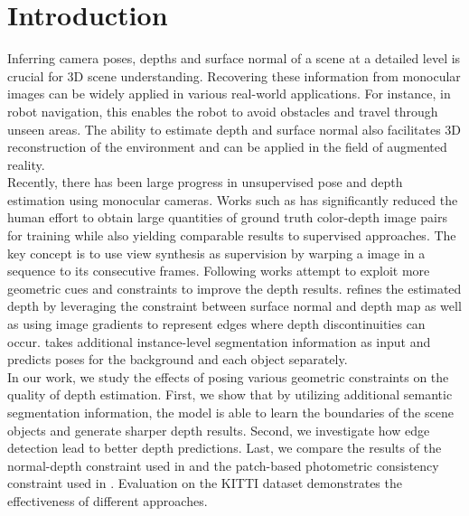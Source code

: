 \documentclass[10pt,twocolumn,letterpaper]{article}
\begin{document}
\section{Introduction}
Inferring camera poses, depths and surface normal of a scene at a detailed level is crucial for 3D scene understanding. Recovering these information from monocular images can be widely applied in various real-world applications. For instance, in robot navigation, this enables the robot to avoid obstacles and travel through unseen areas. The ability to estimate depth and surface normal also facilitates 3D reconstruction of the environment and can be applied in the field of augmented reality. \\
Recently, there has been large progress in unsupervised pose and depth estimation using monocular cameras. Works such as \cite{zhou2017unsupervised} has significantly reduced the human effort to obtain large quantities of ground truth color-depth image pairs for training while also yielding comparable results to supervised approaches. The key concept is to use view synthesis as supervision by warping a image in a sequence to its consecutive frames. Following works attempt to exploit more geometric cues and constraints to improve the depth results.\cite{yang2018lego} refines the estimated depth by leveraging the constraint between surface normal and depth map as well as using image gradients to represent edges where depth discontinuities can occur.  \cite{casser2018depth} takes additional instance-level segmentation information as input and predicts poses for the background and each object separately. \\
In our work, we study the effects of posing various geometric constraints on the quality of depth estimation. First, we show that by utilizing additional semantic segmentation information, the model is able to learn the boundaries of the scene objects and generate sharper depth results. Second, we investigate how edge detection lead to better depth predictions. Last, we compare the results of the normal-depth constraint used in \cite{yang2018lego} and the patch-based photometric consistency constraint used in  \cite{furukawa2010accurate}. Evaluation on the KITTI dataset demonstrates the effectiveness of different approaches.


\end{document}
